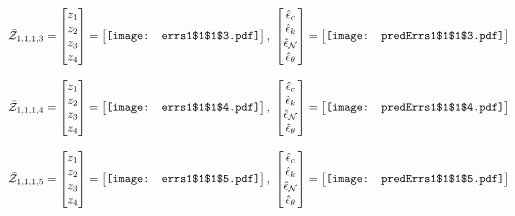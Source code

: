 \documentclass[12pt]{article}
\begin{document}
\begin{gather*}
\bar{\mathcal{Z}}_{1,1,1,3}=\begin{bmatrix}
z_1\\
z_2\\
z_3\\
z_4
 \end{bmatrix}= \begin{bmatrix}
\vcenter{\hbox{\texttt{[image: errs1\$1\$1\$3.pdf]}}}
 \end{bmatrix},\,\, \begin{bmatrix}
\hat{\epsilon}_c\\\hat{\epsilon}_k\\\hat{\epsilon}_\mathcal{N}\\\hat{\epsilon}_\theta
 \end{bmatrix}=\begin{bmatrix}
\vcenter{\hbox{\texttt{[image: predErrs1\$1\$1\$3.pdf]}}}
 \end{bmatrix}
\end{gather*}


\begin{gather*}
\bar{\mathcal{Z}}_{1,1,1,4}=\begin{bmatrix}
z_1\\
z_2\\
z_3\\
z_4
 \end{bmatrix}= \begin{bmatrix}
\vcenter{\hbox{\texttt{[image: errs1\$1\$1\$4.pdf]}}}
 \end{bmatrix},\,\, \begin{bmatrix}
\hat{\epsilon}_c\\\hat{\epsilon}_k\\\hat{\epsilon}_\mathcal{N}\\\hat{\epsilon}_\theta
 \end{bmatrix}=\begin{bmatrix}
\vcenter{\hbox{\texttt{[image: predErrs1\$1\$1\$4.pdf]}}}
 \end{bmatrix}
\end{gather*}

\begin{gather*}
\bar{\mathcal{Z}}_{1,1,1,5}=\begin{bmatrix}
z_1\\
z_2\\
z_3\\
z_4
 \end{bmatrix}= \begin{bmatrix}
\vcenter{\hbox{\texttt{[image: errs1\$1\$1\$5.pdf]}}}
 \end{bmatrix},\,\, \begin{bmatrix}
\hat{\epsilon}_c\\\hat{\epsilon}_k\\\hat{\epsilon}_\mathcal{N}\\\hat{\epsilon}_\theta
 \end{bmatrix}=\begin{bmatrix}
\vcenter{\hbox{\texttt{[image: predErrs1\$1\$1\$5.pdf]}}}
 \end{bmatrix}
\end{gather*}
\end{document}
